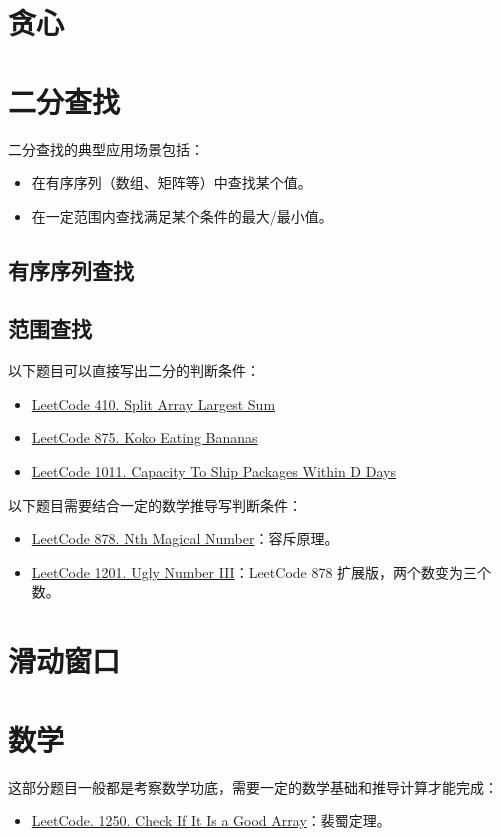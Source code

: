 \section{贪心}

\section{二分查找}
二分查找的典型应用场景包括：

\begin{itemize}
  \item 在有序序列（数组、矩阵等）中查找某个值。
  \item 在一定范围内查找满足某个条件的最大/最小值。
\end{itemize}

\subsection{有序序列查找}

\subsection{范围查找}
以下题目可以直接写出二分的判断条件：

\begin{itemize}
  \label{lc:bs-range-general}
  \item
    \href{https://leetcode.com/problems/split-array-largest-sum/}{LeetCode 410. Split Array Largest Sum}
  \item
    \href{https://leetcode.com/problems/koko-eating-bananas/}{LeetCode 875. Koko Eating Bananas}
  \item
    \href{https://leetcode.com/problems/capacity-to-ship-packages-within-d-days/}{LeetCode
      1011. Capacity To Ship Packages Within D Days}
\end{itemize}

以下题目需要结合一定的数学推导写判断条件：

\begin{itemize}
  \label{lc:bs-range-math}
  \item
    \href{https://leetcode.com/problems/nth-magical-number/}{LeetCode 878. Nth
      Magical Number}：容斥原理。
  \item
    \href{https://leetcode.com/problems/ugly-number-iii/}{LeetCode 1201. Ugly
      Number III}：LeetCode 878 扩展版，两个数变为三个数。

\end{itemize}

\section{滑动窗口}

\section{数学}

这部分题目一般都是考察数学功底，需要一定的数学基础和推导计算才能完成：

\begin{itemize}
  \item
    \href{https://leetcode.com/problems/check-if-it-is-a-good-array/}{LeetCode.
      1250. Check If It Is a Good Array}：裴蜀定理。
\end{itemize}


